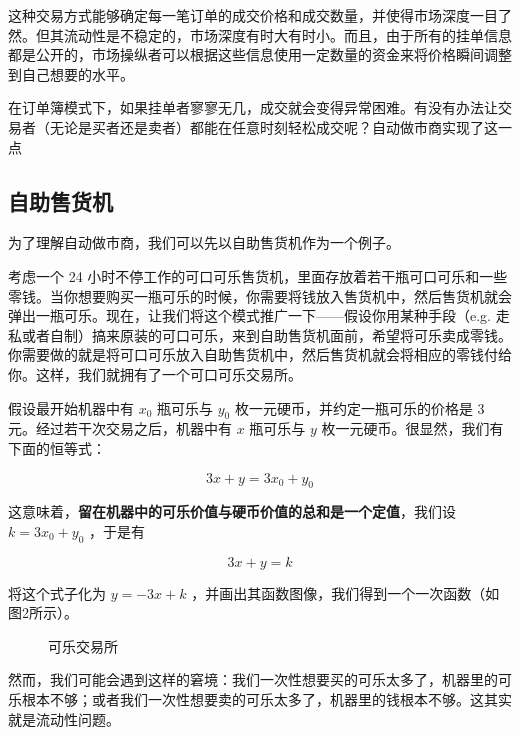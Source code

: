 \documentclass[12pt, a4paper, oneside]{ctexart}
\begin{document}
这种交易方式能够确定每一笔订单的成交价格和成交数量，并使得市场深度一目了然。但其流动性是不稳定的，市场深度有时大有时小。而且，由于所有的挂单信息都是公开的，市场操纵者可以根据这些信息使用一定数量的资金来将价格瞬间调整到自己想要的水平。

在订单簿模式下，如果挂单者寥寥无几，成交就会变得异常困难。有没有办法让交易者（无论是买者还是卖者）都能在任意时刻轻松成交呢？自动做市商实现了这一点

\subsection{自助售货机}

为了理解自动做市商，我们可以先以自助售货机作为一个例子。

考虑一个 24 小时不停工作的可口可乐售货机，里面存放着若干瓶可口可乐和一些零钱。当你想要购买一瓶可乐的时候，你需要将钱放入售货机中，然后售货机就会弹出一瓶可乐。现在，让我们将这个模式推广一下——假设你用某种手段（e.g. 走私或者自制）搞来原装的可口可乐，来到自助售货机面前，希望将可乐卖成零钱。你需要做的就是将可口可乐放入自助售货机中，然后售货机就会将相应的零钱付给你。这样，我们就拥有了一个可口可乐交易所。

假设最开始机器中有 $x_0$ 瓶可乐与 $y_0$ 枚一元硬币，并约定一瓶可乐的价格是 3 元。经过若干次交易之后，机器中有 $x$ 瓶可乐与 $y$ 枚一元硬币。很显然，我们有下面的恒等式：

\begin{equation}
    3x + y = 3x_0 + y_0
\end{equation}

这意味着，\textbf{留在机器中的可乐价值与硬币价值的总和是一个定值}，我们设 $k=3x_0+y_0$ ，于是有

\begin{equation}
    3x + y = k
\end{equation}

将这个式子化为 $y = -3x + k$ ，并画出其函数图像，我们得到一个一次函数（如图2所示）。

\begin{figure}[htbp]
    \centering
    \caption{可乐交易所}
\end{figure}

然而，我们可能会遇到这样的窘境：我们一次性想要买的可乐太多了，机器里的可乐根本不够；或者我们一次性想要卖的可乐太多了，机器里的钱根本不够。这其实就是流动性问题。
\end{document}
